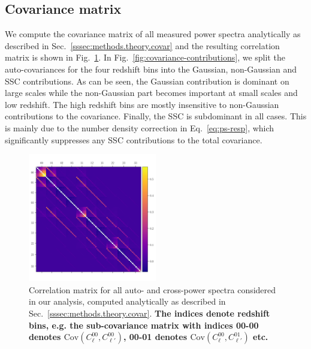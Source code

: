 \documentclass[a4paper,11pt]{article}
\newcommand{\rev}[1]{{\textbf{#1}}}
\begin{document}
    
  \subsection{Covariance matrix}\label{ssec:results.covariance}
    We compute the covariance matrix of all measured power spectra analytically as described in Sec.~\ref{sssec:methods.theory.covar} and the resulting correlation matrix is shown in Fig.~\ref{fig:covmat}. In Fig.~\ref{fig:covariance-contributions}, we split the auto-covariances for the four redshift bins into the Gaussian, non-Gaussian and SSC contributions. As can be seen, the Gaussian contribution is dominant on large scales while the non-Gaussian part becomes important at small scales and low redshift. The high redshift bins are mostly insensitive to non-Gaussian contributions to the covariance. Finally, the SSC is subdominant in all cases. This is mainly due to the number density correction in Eq.~\ref{eq:ps-resp}, which significantly suppresses any SSC contributions to the total covariance.
    \begin{figure}
      \begin{center}
        \includegraphics[width=0.5\textwidth]{figures/covmat_HSC_dg_hoddg_hodxdg_hoddg_hod_trisp=4h3h2h_SSC=LINBIAS-resp_l=ells_eff_all_wcross_clfit=HOD-zevol_culled=True_coadd=area_G+NG+SSC.pdf}
        \caption{Correlation matrix for all auto- and cross-power spectra considered in our analysis, computed analytically as described in Sec.~\ref{sssec:methods.theory.covar}. \rev{The indices denote redshift bins, e.g. the sub-covariance matrix with indices 00-00 denotes $\mathrm{Cov}(C^{00}_{\ell}, C^{00}_{\ell'})$, 00-01 denotes $\mathrm{Cov}(C^{00}_{\ell}, C^{01}_{\ell'})$ etc.}}\label{fig:covmat}
      \end{center}
    \end{figure}
\end{document}
